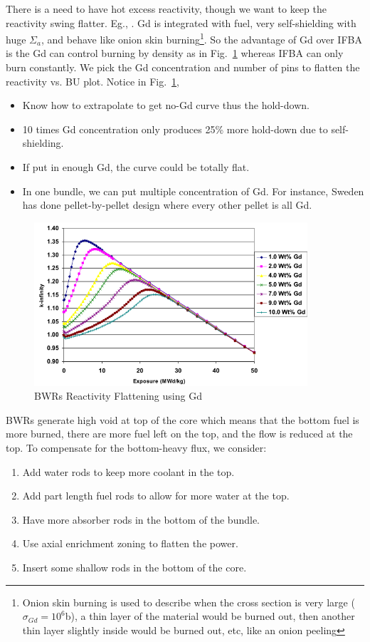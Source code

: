 \documentclass{school-22.211-notes}
\begin{document}
There is a need to have hot excess reactivity, though we want to keep the reactivity swing flatter. Eg., . Gd is integrated with fuel, very self-shielding with huge $\Sigma_a$, and behave like onion skin burning\footnote{Onion skin burning is used to describe when the cross section is very large ($\sigma_{Gd} = 10^6$b), a thin layer of the material would be burned out, then another thin layer slightly inside would be burned out, etc, like an onion peeling}. So the advantage of Gd over IFBA is the Gd can control burning by density as in Fig.~\ref{BWR-Gd} whereas IFBA can only burn constantly. We pick the Gd concentration and number of pins to flatten the reactivity vs. BU plot. Notice in Fig.~\ref{BWR-Gd}, 
\begin{itemize}
\item Know how to extrapolate to get no-Gd curve thus the hold-down. 
\item 10 times Gd concentration only produces 25\% more hold-down due to self-shielding. 
\item If put in enough Gd, the curve could be totally flat. 
\item In one bundle, we can put multiple concentration of Gd. For instance, Sweden has done pellet-by-pellet design where every other pellet is all Gd. 
\end{itemize}
  \begin{figure}[ht]
    \centering
    \includegraphics[width=4in]{images/design/BWR-Gd.png}
    \caption{BWRs Reactivity Flattening using Gd} \label{BWR-Gd} 
    \end{figure}

BWRs generate high void at top of the core which means that the bottom fuel is more burned, there are more fuel left on the top, and the flow is reduced at the top. To compensate for the bottom-heavy flux, we consider: 
\begin{enumerate}
\item Add water rods to keep more coolant in the top. 
\item Add part length fuel rods to allow for more water at the top. 
\item Have more absorber rods in the bottom of the bundle. 
\item Use axial enrichment zoning to flatten the power. 
\item Insert some shallow rods in the bottom of the core. 
\end{enumerate}
\end{document}
